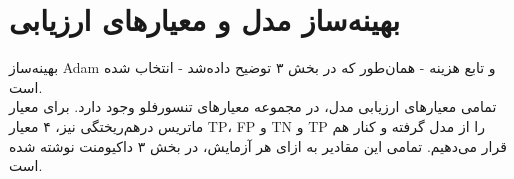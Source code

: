 \documentclass{article}
\begin{document}
\section{
بهینه‌ساز مدل و معیارهای ارزیابی
}

بهینه‌ساز Adam و تابع هزینه  - همان‌طور که در بخش ۳ توضیح داده‌شد - انتخاب شده است. \\

تمامی معیارهای ارزیابی مدل، در مجموعه معیارهای تنسورفلو وجود دارد. برای معیار ماتریس درهم‌ریختگی نیز، ۴ معیار TP، FP و TN و TP را از مدل گرفته و کنار هم قرار می‌دهیم. تمامی این مقادیر به ازای هر آزمایش، در بخش ۳ داکیومنت نوشته شده است.



\medskip

\small
\LTR 
\latin
\end{document}
